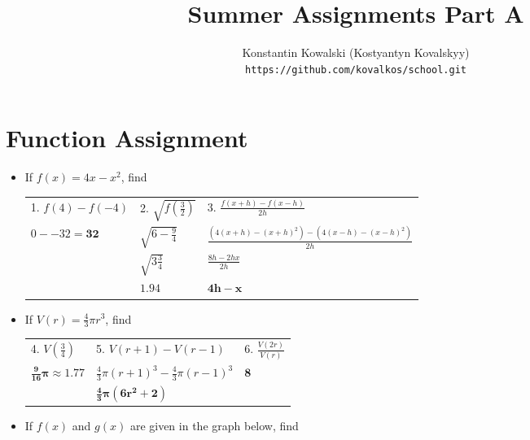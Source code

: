 \documentclass[a4paper]{article}
\begin{document}
   \title{Summer Assignments Part A} 
   \author{ Konstantin Kowalski (Kostyantyn Kovalskyy) \\ \texttt{https://github.com/kovalkos/school.git} }
   \maketitle

   \section{Function Assignment}

   \begin{itemize} \itemsep 3em

   \item
      If $ f(x) = 4x-x^2 $, find

      \begin{tabular}{ p{5cm} p{5cm} p{5cm} }
         1. $ f(4)-f(-4)                  $&
         2. $ \sqrt{ f( \frac{3}{2} ) }   $&
         3. $ \frac{ f(x+h)-f(x-h) }{ 2h }$
      \\
         $ 0 - -32 = \bm{32}              $&
         $ \sqrt{ 6 - \frac{9}{4} }       $&
         $ \frac{ (4(x+h)-(x+h)^2) - (4(x-h) - (x-h)^2) }{ 2h } $
      \\
         & %
         $ \sqrt{ 3 \frac{3}{4} }         $&
         $ \frac{ 8h - 2hx }{ 2h }        $
      \\
         & %
         $ \bm{1.94}                      $&
         $ \bm{4h-x}                      $
      \end{tabular}

   \item
      If $ V(r) = \frac{4}{3} \pi r^3 $, find
        
      \begin{tabular}{ p{5cm} p{5cm} p{5cm} }
         4. $ V( \frac{3}{4} )            $&
         5. $ V(r+1)-V(r-1)               $&
         6. $ \frac{ V(2r) }{ V(r) }      $
      \\
         $ \bm{ \frac{9}{16} \pi \approx 1.77 }                $&
         $ \frac{4}{3} \pi (r+1)^3 - \frac{4}{3} \pi (r-1)^3   $&
         $ \bm{8}                                              $
      \\
         & %
         $ \bm{ \frac{4}{3} \pi (6r^2 + 2) }                   $
      \end{tabular}
      
   \item
      If $ f(x) $ and $ g(x) $ are given in the graph below, find


\end{itemize}
\end{document}
